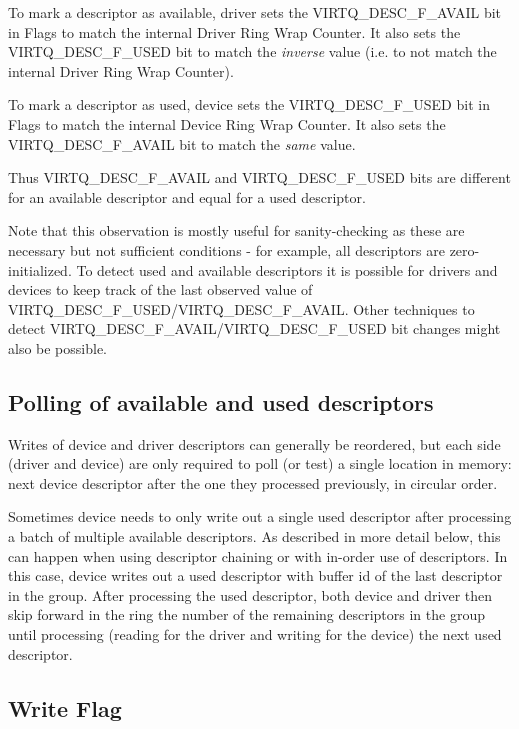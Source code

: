To mark a descriptor as available, driver sets the
VIRTQ_DESC_F_AVAIL bit in Flags to match the internal Driver
Ring Wrap Counter.  It also sets the VIRTQ_DESC_F_USED bit to match the
\emph{inverse} value (i.e. to not match the internal Driver Ring
Wrap Counter).

To mark a descriptor as used, device sets the
VIRTQ_DESC_F_USED bit in Flags to match the internal Device
Ring Wrap Counter.  It also sets the VIRTQ_DESC_F_AVAIL bit to match the
\emph{same} value.

Thus VIRTQ_DESC_F_AVAIL and VIRTQ_DESC_F_USED bits are different
for an available descriptor and equal for a used descriptor.

Note that this observation is mostly useful for sanity-checking
as these are necessary but not sufficient conditions - for
example, all descriptors are zero-initialized. To detect used and
available descriptors it is possible for drivers and devices to
keep track of the last observed value of
VIRTQ_DESC_F_USED/VIRTQ_DESC_F_AVAIL.  Other techniques to detect
VIRTQ_DESC_F_AVAIL/VIRTQ_DESC_F_USED bit changes might also be
possible.

\subsection{Polling of available and used descriptors}
\label{sec:Packed Virtqueues / Polling of available and used descriptors}

Writes of device and driver descriptors can generally be
reordered, but each side (driver and device) are only required to
poll (or test) a single location in memory: next device descriptor after
the one they processed previously, in circular order.

Sometimes device needs to only write out a single used descriptor
after processing a batch of multiple available descriptors.  As
described in more detail below, this can happen when using
descriptor chaining or with in-order
use of descriptors.  In this case, device writes out a used
descriptor with buffer id of the last descriptor in the group.
After processing the used descriptor, both device and driver then
skip forward in the ring the number of the remaining descriptors
in the group until processing (reading for the driver and writing
for the device) the next used descriptor.

\subsection{Write Flag}
\label{sec:Packed Virtqueues / Write Flag}

